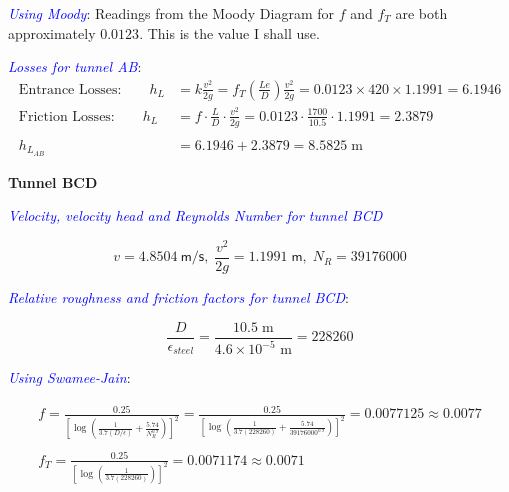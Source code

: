 \documentclass[10pt]{amsart}
\begin{document}

\textcolor{blue}{\em Using Moody}:
Readings from the Moody Diagram for $f$ and $f_T$ are both approximately $0.0123$. This is the
value I shall use.

\textcolor{blue}{\em Losses for tunnel AB}:
\begin{align*}
	\text{Entrance Losses:}\qquad h_{L} & = k\frac{v^2}{2g} =
	f_T\left(\frac{Le}{D}\right)\frac{v^2}{2g}=0.0123\times 420\times 1.1991 = 6.1946\\
	\text{Friction Losses:}\qquad h_{L} & =  f\cdot\frac{L}{D} \cdot\frac{v^2}{2g} =
	0.0123\cdot\frac{1700}{10.5}\cdot1.1991 = 2.3879\\\\
	h_{L_{AB}}                          & = 6.1946+2.3879 = 8.5825\;\text{m}
\end{align*}

\textbf{Tunnel BCD}

\textcolor{blue}{\em Velocity, velocity head and Reynolds Number for tunnel BCD }

\[
	v = 4.8504\mathsf{\ m/s},\;\frac{v^2}{2g} = 1.1991\mathsf{\; m},\; N_R = 39176000
\]

\textcolor{blue}{\em Relative roughness and friction factors for tunnel BCD}:

\[
	\frac{D}{\epsilon_{steel}} = \frac{10.5\;\text{m}}{4.6\times10^{-5}\text{ m}} = 228260
\]

\textcolor{blue}{\em Using Swamee-Jain}:

\begin{gather*}
	f = \frac{0.25}{\left[\log\left(\frac{1}{3.7(D/\epsilon)}+\frac{5.74}{N_R^{0.9}}\right)\right]^2} =
	\frac{0.25}{\left[\log\left(\frac{1}{3.7(228260)}+\frac{5.74}{39176000^{0.9}}\right)\right]^2}=0.0077125\approx 0.0077
	\\\\
	f_T = \frac{0.25}{\left[\log\left(\frac{1}{3.7(228260)}\right)\right]^2} = 0.0071174\approx 0.0071
\end{gather*}
\end{document}
